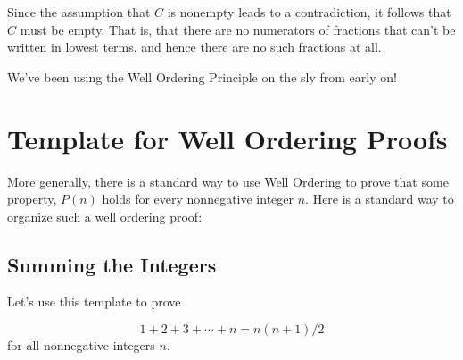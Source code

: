 Since the assumption that $C$ is nonempty leads to a contradiction, it
follows that $C$ must be empty.  That is, that there are no numerators of
fractions that can't be written in lowest terms, and hence there are no
such fractions at all.

We've been using the Well Ordering Principle on the sly from early on!

\section{Template for Well Ordering Proofs}

More generally, there is a standard way to use Well Ordering to prove that
some property, $P(n)$ holds for every nonnegative integer $n$.  Here is a
standard way to organize such a well ordering proof:

\subsection{Summing the Integers}
Let's use this template to prove %

\begin{theorem}  \label{sum_to_n_thm}
\begin{equation}\label{sum1n}
1 + 2 + 3 + \cdots + n = n(n+1)/2
\end{equation}
for all nonnegative integers $n$.
\end{theorem}


